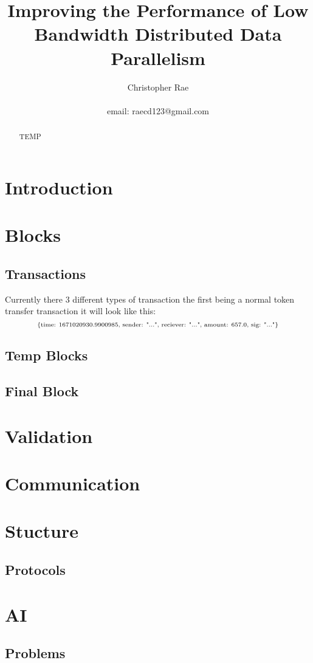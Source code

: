 \documentclass[11pt]{extarticle}
\title{Improving the Performance of Low Bandwidth Distributed Data Parallelism}
\author{Christopher Rae \\ \begin{small} email: raecd123@gmail.com \end{small}}
\date{}
\newcommand{\textify}[1]{\text{\begin{scriptsize}#1\end{scriptsize}}}
\begin{document}
\maketitle

\begin{abstract}
TEMP
\end{abstract}

\section{Introduction}

\section{Blocks} 
\subsection{Transactions}
Currently there 3 different types of transaction the first being a normal token transfer transaction it will look like this:
$$\textify{\{time: 1671020930.9900985,  sender: "...",  reciever: "...",  amount: 657.0,  sig: "..."\}} $$ 

\subsection{Temp Blocks}
\subsection{Final Block}
\section{Validation}

\section{Communication}
\section{Stucture}
\subsection{Protocols}

\section{AI}
\subsection{Problems}



\end{document}
